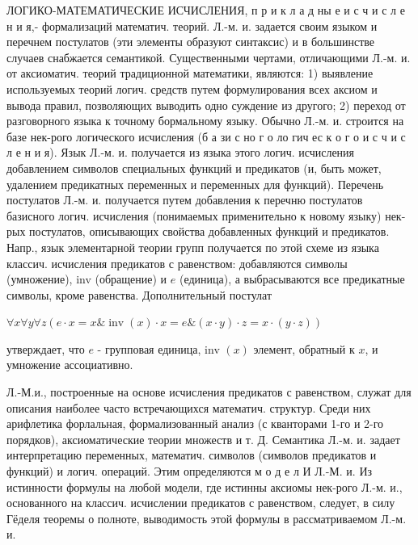 \documentclass[10pt]{article}
\begin{document}
ЛОГИКО-МАТЕМАТИЧЕСКИЕ ИСЧИСЛЕНИЯ, п р и к л а д ны е и с ч и с л е н и я,- формализаций математич. теорий. Л.-м. и. задается своим языком и перечнем постулатов (эти элементы образуют синтаксис) и в большинстве случаев снабжается семантикой. Существенными чертами, отличающими Л.-м. и. от аксиоматич. теорий традиционной математики, являются: 1) выявление используемых теорий логич. средств путем формулирования всех аксиом и вывода правил, позволяющих выводить одно суждение из другого; 2) переход от разговорного языка к точному бормальному языку. Обычно Л.-м. и. строится на базе нек-рого логического исчисления (б а зи с но г о ло гич ес к о г о и с ч и с л е н и я). Язык Л.-м. и. получается из языка этого логич. исчисления добавлением символов специальных функций и предикатов (и, быть может, удалением предикатных переменных и переменных для функций). Перечень постулатов Л.-м. и. получается путем добавления к перечню постулатов базисного логич. исчисления (понимаемых применительно к новому языку) нек-рых постулатов, описывающих свойства добавленных функций и предикатов. Напр., язык элементарной теории групп получается по этой схеме из языка классич. исчисления предикатов с равенством: добавляются символы (умножение), inv (обращение) и $e$ (единица), а выбрасываются все предикатные символы, кроме равенства. Дополнительный постулат



$\forall x \forall y \forall z(e \cdot x=x \& \operatorname{inv}(x) \cdot x=e \&(x \cdot y) \cdot z=x \cdot(y \cdot z))$



утверждает, что $e$ - групповая единица, inv $(x)$ элемент, обратный к $x$, и умножение ассоциативно.



Л.-М.и., построенные на основе исчисления предикатов с равенством, служат для описания наиболее часто встречающихся математич. структур. Среди них арифлетика форлальная, формализованный анализ (с кванторами 1-го и 2-го порядков), аксиоматические теории множеств и т. Д. Семантика Л.-м. и. задает интерпретацию переменных, математич. символов (символов предикатов и функций) и логич. операций. Этим определяются м о д е л И Л.-М. и. Из истинности формулы на любой модели, где истинны аксиомы нек-рого Л.-м. и., основанного на классич. исчислении предикатов с равенством, следует, в силу Гёделя теоремы о полноте, выводимость этой формулы в рассматриваемом Л.-м. и.
\end{document}
